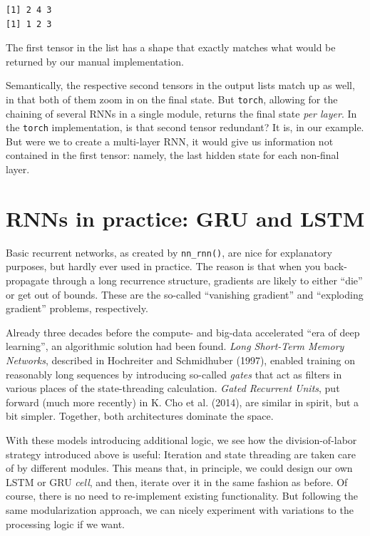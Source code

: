 \documentclass[
  letterpaper,
]{krantz}
\begin{document}
\begin{verbatim}
[1] 2 4 3
[1] 1 2 3
\end{verbatim}

The first tensor in the list has a shape that exactly matches what would
be returned by our manual implementation.

Semantically, the respective second tensors in the output lists match up
as well, in that both of them zoom in on the final state. But
\texttt{torch}, allowing for the chaining of several RNNs in a single
module, returns the final state \emph{per layer}. In the \texttt{torch}
implementation, is that second tensor redundant? It is, in our example.
But were we to create a multi-layer RNN, it would give us information
not contained in the first tensor: namely, the last hidden state for
each non-final layer.

\hypertarget{rnns-in-practice-gru-and-lstm}{%
\section{RNNs in practice: GRU and
LSTM}\label{rnns-in-practice-gru-and-lstm}}

Basic recurrent networks, as created by \texttt{nn\_rnn()}, are nice for
explanatory purposes, but hardly ever used in practice. The reason is
that when you back-propagate through a long recurrence structure,
gradients are likely to either ``die'' or get out of bounds. These are
the so-called ``vanishing gradient'' and ``exploding gradient''
problems, respectively.

Already three decades before the compute- and big-data accelerated ``era
of deep learning'', an algorithmic solution had been found. \emph{Long
Short-Term Memory Networks}, described in Hochreiter and Schmidhuber
(1997), enabled training on reasonably long sequences by introducing
so-called \emph{gates} that act as filters in various places of the
state-threading calculation. \emph{Gated Recurrent Units}, put forward
(much more recently) in K. Cho et al. (2014), are similar in spirit, but
a bit simpler. Together, both architectures dominate the space.

With these models introducing additional logic, we see how the
division-of-labor strategy introduced above is useful: Iteration and
state threading are taken care of by different modules. This means that,
in principle, we could design our own LSTM or GRU \emph{cell}, and then,
iterate over it in the same fashion as before. Of course, there is no
need to re-implement existing functionality. But following the same
modularization approach, we can nicely experiment with variations to the
processing logic if we want.
\end{document}

